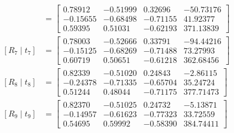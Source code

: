 \begin{align*}
[R_{6}\mid t_{6}] &= \begin{bmatrix}0.78912 & -0.51999 & 0.32696 & -50.73176 \\ -0.15655 & -0.68498 & -0.71155 & 41.92377 \\ 0.59395 & 0.51031 & -0.62193 & 371.13839\end{bmatrix} \\
[R_{7}\mid t_{7}] &= \begin{bmatrix}0.78003 & -0.52666 & 0.33791 & -94.44216 \\ -0.15125 & -0.68269 & -0.71488 & 73.27993 \\ 0.60719 & 0.50651 & -0.61218 & 362.68456\end{bmatrix} \\
[R_{8}\mid t_{8}] &= \begin{bmatrix}0.82339 & -0.51020 & 0.24843 & -2.86115 \\ -0.24378 & -0.71335 & -0.65704 & 35.24724 \\ 0.51244 & 0.48044 & -0.71175 & 377.71473\end{bmatrix} \\
[R_{9}\mid t_{9}] &= \begin{bmatrix}0.82370 & -0.51025 & 0.24732 & -5.13871 \\ -0.14957 & -0.61623 & -0.77323 & 33.72559 \\ 0.54695 & 0.59992 & -0.58390 & 384.74411\end{bmatrix} \\
\end{align*}